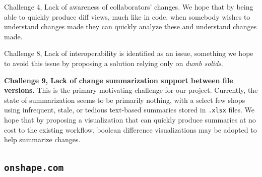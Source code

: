 \documentclass[sigconf,authorversion,nonacm]{acmart}
\begin{document}
Challenge 4, Lack of awareness of collaborators' changes.
We hope that by being able to quickly produce diff views, much like in code, when somebody wishes to understand changes made they can quickly analyze these and understand changes made.

Challenge 8, Lack of interoperability is identified as an issue, something we hope to avoid this issue by proposing a solution relying only on \emph{dumb solids}.

\textbf{Challenge 9, Lack of change summarization support between file versions.}
This is the primary motivating challenge for our project.
Currently, the state of summarization seems to be primarily nothing, with a select few shops using infrequent, stale, or tedious text-based summaries stored in \texttt{.xlsx} files.
We hope that by proposing a visualization that can quickly produce summaries at no cost to the existing workflow, boolean difference visualizations may be adopted to help summarize changes.

\subsection{\texttt{onshape.com}}
\end{document}
